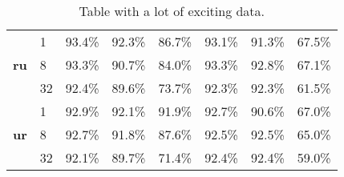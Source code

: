 \begin{table}[h!]
\begin{tabular}{c l c c c|c c c}
        \cmidrule(lr){1-8}
        \multirow{3}{*}{\bfseries ru}
        &  1 & 93.4\% & 92.3\% & 86.7\% & 93.1\% & 91.3\% & 67.5\% \\
        &  8 & 93.3\% & 90.7\% & 84.0\% & 93.3\% & 92.8\% & 67.1\% \\
        & 32 & 92.4\% & 89.6\% & 73.7\% & 92.3\% & 92.3\% & 61.5\% \\

        \cmidrule(lr){1-8}
        \multirow{3}{*}{\bfseries ur}
        &  1 & 92.9\% & 92.1\% & 91.9\% & 92.7\% & 90.6\% & 67.0\% \\
        &  8 & 92.7\% & 91.8\% & 87.6\% & 92.5\% & 92.5\% & 65.0\% \\
        & 32 & 92.1\% & 89.7\% & 71.4\% & 92.4\% & 92.4\% & 59.0\% \\
        \bottomrule
    \end{tabular}
    \caption{Table with a lot of exciting data.
    }\label{table:acc-total-pos}
\end{table}




\pagebreak

